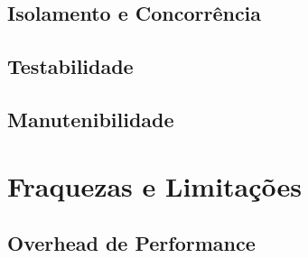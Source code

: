 \subsection{Isolamento e Concorrência}


\subsection{Testabilidade}


\subsection{Manutenibilidade}


\section{Fraquezas e Limitações}


\subsection{Overhead de Performance}


